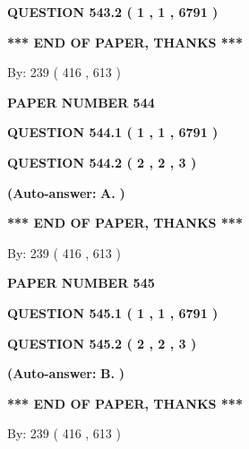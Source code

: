 \documentclass[12pt]{article}
\begin{document}
 
  
  
{\textbf{\large{QUESTION
543.2 
 ( 1 , 1 , 6791 )
}}}
   
   
   
   
\vspace{1.0in} 
{\textbf{\large{ *** END OF PAPER, THANKS *** }}} 
   
   
\hspace{1.0in} By: 
 239 ( 416 ,  613 )
   
   
   
   
\newpage 
\setcounter{page}{ 
   544001 } 
   
   
 {\textbf{ \Large{ PAPER NUMBER  544  }}}
   
   
   
   
  
  
{\textbf{\large{QUESTION
544.1 
 ( 1 , 1 , 6791 )
}}}
  
  
{\textbf{\large{QUESTION
544.2 
 ( 2 , 2 , 3 )
}}}
 
 
{\textbf{(Auto-answer:}}
{\textbf{\large{
A.}}}
{\textbf{)}}
 
 
   
   
   
   
\vspace{1.0in} 
{\textbf{\large{ *** END OF PAPER, THANKS *** }}} 
   
   
\hspace{1.0in} By: 
 239 ( 416 ,  613 )
   
   
   
   
\newpage 
\setcounter{page}{ 
   545001 } 
   
   
 {\textbf{ \Large{ PAPER NUMBER  545  }}}
   
   
   
   
  
  
{\textbf{\large{QUESTION
545.1 
 ( 1 , 1 , 6791 )
}}}
  
  
{\textbf{\large{QUESTION
545.2 
 ( 2 , 2 , 3 )
}}}
 
 
{\textbf{(Auto-answer:}}
{\textbf{\large{
B.}}}
{\textbf{)}}
 
 
   
   
   
   
\vspace{1.0in} 
{\textbf{\large{ *** END OF PAPER, THANKS *** }}} 
   
   
\hspace{1.0in} By: 
 239 ( 416 ,  613 )
   
   
   
   
\newpage 
\setcounter{page}{ 
   546001 } 
   
\end{document}
